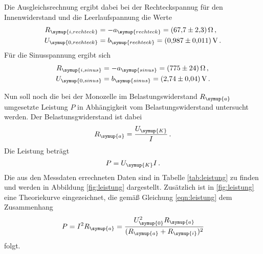 Die Ausgleichsrechnung ergibt dabei bei der Rechteckspannug für den Innenwiderstand
und die Leerlaufspannung die Werte
\begin{align}
  R_{\symup{i,rechteck}}&=-a_{\symup{rechteck}} = \SI{67.7(23)}{\ohm} \,, \\
  U_{\symup{0,rechteck}}&=b_{\symup{rechteck}} = \SI{0.987(0011)}{\volt} \,.
\end{align}
Für die Sinusspannung ergibt sich
\begin{align}
  R_{\symup{i,sinus}}&=-a_{\symup{sinus}} = \SI{775(24)}{\ohm} \,, \\
  U_{\symup{0,sinus}}&=b_{\symup{sinus}} = \SI{2.74(004)}{\volt} \,.
\end{align}


Nun soll noch die bei der Monozelle im Belastungswiderstand $R_{\symup{a}}$ umgesetzte
Leistung $P$ in Abhängigkeit vom Belastungswiderstand untersucht werden.
Der Belastunsgwiderstand ist dabei
\begin{equation}
  R_{\symup{a}}=\frac{U_{\symup{K}}}{I}\,.
\end{equation}
Die Leistung beträgt
\begin{equation}
  P=U_{\symup{K}}I\,.
\end{equation}
Die aus den Messdaten errechneten Daten sind in Tabelle \ref{tab:leistung} zu finden und
werden in Abbildung \ref{fig:leistung} dargestellt. Zusätzlich ist in \ref{fig:leistung} eine
Theoriekurve eingezeichnet, die gemäß Gleichung \eqref{eqn:leistung} dem Zusammenhang
\begin{equation}
  P=I^2 R_{\symup{a}} = \frac{U_{\symup{0}}^2 R_{\symup{a}}}{(R_{\symup{a}}+R_{\symup{i}})^2}
\end{equation}
folgt.

